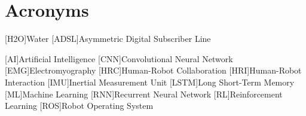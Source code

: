 \chapter{Acronyms}

\footnotesize
\SingleSpacing

\begin{acronym}[AAAAAA]

    [H2O]{Water}
    [ADSL]{Asymmetric Digital Subscriber Line}

    [AI]{Artificial Intelligence}
    [CNN]{Convolutional Neural Network}
    [EMG]{Electromyography}
    [HRC]{Human-Robot Collaboration}
    [HRI]{Human-Robot Interaction}
    [IMU]{Inertial Measurement Unit}
    [LSTM]{Long Short-Term Memory}
    [ML]{Machine Learning}
    [RNN]{Recurrent Neural Network}
    [RL]{Reinforcement Learning}
    [ROS]{Robot Operating System}

\end{acronym}
